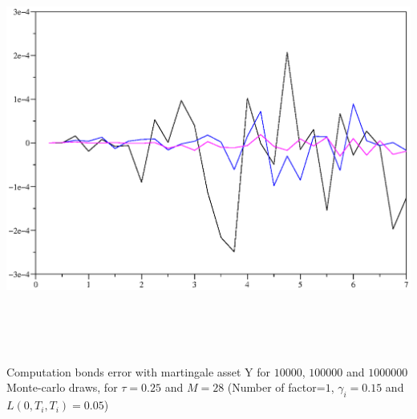 \documentclass[10pt,a4paper,english,landscape]{slides}
\begin{document}
\begin{center}
\includegraphics[height=14cm]{./figures/bondserrorY.eps}\\
{\small Computation bonds error with martingale asset Y for $10 000$, $100 000$ and $1 000 000$ Monte-carlo  draws, for $\tau=0.25$ and $M=28$ (Number of factor=$1$, $\gamma_i=0.15$ and $L(0,T_i,T_i)=0.05$)}
\end{center}


\end{document}
